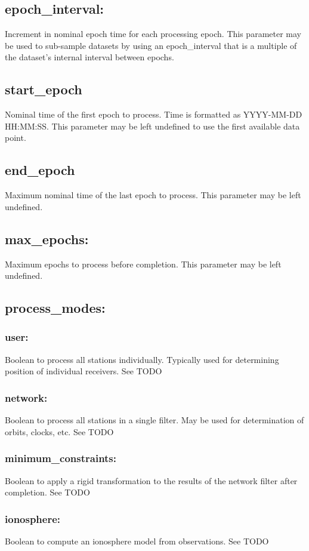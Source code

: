 \subsection{epoch\_interval:}
Increment in nominal epoch time for each processing epoch. This parameter may be used to sub-sample datasets by using an epoch\_interval that is a multiple of the dataset's internal interval between epochs.

\subsection{start\_epoch}
Nominal time of the first epoch to process. Time is formatted as YYYY-MM-DD HH:MM:SS.
This parameter may be left undefined to use the first available data point.

\subsection{end\_epoch}
Maximum nominal time of the last epoch to process. This parameter may be left undefined.

\subsection{max\_epochs:}
Maximum epochs to process before completion. This parameter may be left undefined.

\subsection{process\_modes:}

\subsubsection{user:}
Boolean to process all stations individually. Typically used for determining position of individual receivers. See TODO
\subsubsection{network:}
Boolean to process all stations in a single filter. May be used for determination of orbits, clocks, etc. See TODO
\subsubsection{minimum\_constraints:}
Boolean to apply a rigid transformation to the results of the network filter after completion. See TODO
\subsubsection{ionosphere:}
Boolean to compute an ionosphere model from observations. See TODO
